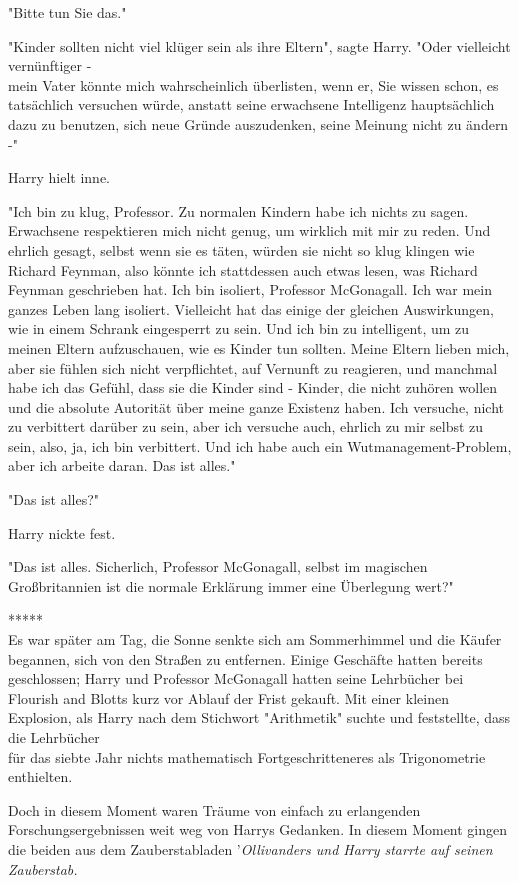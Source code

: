 {"Bitte tun Sie das."

"Kinder sollten nicht viel klüger sein als ihre Eltern", sagte Harry. "Oder vielleicht vernünftiger -\\ mein Vater könnte mich wahrscheinlich überlisten, wenn er, Sie wissen schon, es tatsächlich versuchen würde, anstatt seine erwachsene Intelligenz hauptsächlich dazu zu benutzen, sich neue Gründe auszudenken, seine Meinung nicht zu ändern -"

Harry hielt inne.

"Ich bin zu klug, Professor. Zu normalen Kindern habe ich nichts zu sagen. Erwachsene respektieren mich nicht genug, um wirklich mit mir zu reden. Und ehrlich gesagt, selbst wenn sie es täten, würden sie nicht so klug klingen wie Richard Feynman, also könnte ich stattdessen auch etwas lesen, was Richard Feynman geschrieben hat. Ich bin isoliert, Professor McGonagall. Ich war mein ganzes Leben lang isoliert. Vielleicht hat das einige der gleichen Auswirkungen, wie in einem Schrank eingesperrt zu sein. Und ich bin zu intelligent, um zu meinen Eltern aufzuschauen, wie es Kinder tun sollten. Meine Eltern lieben mich, aber sie fühlen sich nicht verpflichtet, auf Vernunft zu reagieren, und manchmal habe ich das Gefühl, dass sie die Kinder sind - Kinder, die nicht zuhören wollen und die absolute Autorität über meine ganze Existenz haben. Ich versuche, nicht zu verbittert darüber zu sein, aber ich versuche auch, ehrlich zu mir selbst zu sein, also, ja, ich bin verbittert. Und ich habe auch ein Wutmanagement-Problem, aber ich arbeite daran. Das ist alles."

"Das ist alles?"

Harry nickte fest.

"Das ist alles. Sicherlich, Professor McGonagall, selbst im magischen Großbritannien ist die normale Erklärung immer eine Überlegung wert?"

*****\\ Es war später am Tag, die Sonne senkte sich am Sommerhimmel und die Käufer begannen, sich von den Straßen zu entfernen. Einige Geschäfte hatten bereits geschlossen; Harry und Professor McGonagall hatten seine Lehrbücher bei Flourish and Blotts kurz vor Ablauf der Frist gekauft. Mit einer kleinen Explosion, als Harry nach dem Stichwort "Arithmetik" suchte und feststellte, dass die Lehrbücher\\ für das siebte Jahr nichts mathematisch Fortgeschritteneres als Trigonometrie enthielten.

Doch in diesem Moment waren Träume von einfach zu erlangenden Forschungsergebnissen weit weg von Harrys Gedanken. In diesem Moment gingen die beiden aus dem Zauberstabladen '\emph{Ollivanders und Harry starrte auf seinen Zauberstab.}

}
